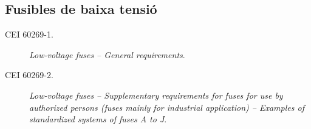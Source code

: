 \subsection*{Fusibles de baixa tensió}
\begin{description}
    \item [\hspace{5mm}CEI 60269-1.] \textit{Low-voltage fuses -- General requirements}.
    \item [\hspace{5mm}CEI 60269-2.] \textit{Low-voltage fuses -- Supplementary requirements for fuses for use by authorized persons
          (fuses mainly for industrial application) -- Examples of standardized systems of fuses A to J}.
\end{description}

